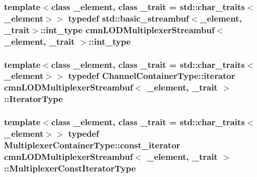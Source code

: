\subsubsection[{int\+\_\+type}]{\setlength{\rightskip}{0pt plus 5cm}template$<$class \+\_\+element, class \+\_\+trait = std\+::char\+\_\+traits$<$\+\_\+element$>$$>$ typedef std\+::basic\+\_\+streambuf$<$\+\_\+element, \+\_\+trait$>$\+::{\bf int\+\_\+type} {\bf cmn\+L\+O\+D\+Multiplexer\+Streambuf}$<$ \+\_\+element, \+\_\+trait $>$\+::{\bf int\+\_\+type}\hspace{0.3cm}{\ttfamily [protected]}}\label{classcmn_l_o_d_multiplexer_streambuf_a8d1eadc5cf72b594aa2c2fef6401fe47}
\hypertarget{classcmn_l_o_d_multiplexer_streambuf_a32236d21fe0e9a13f4bea6ed743b0613}{}
\subsubsection[{Iterator\+Type}]{\setlength{\rightskip}{0pt plus 5cm}template$<$class \+\_\+element, class \+\_\+trait = std\+::char\+\_\+traits$<$\+\_\+element$>$$>$ typedef Channel\+Container\+Type\+::iterator {\bf cmn\+L\+O\+D\+Multiplexer\+Streambuf}$<$ \+\_\+element, \+\_\+trait $>$\+::{\bf Iterator\+Type}}\label{classcmn_l_o_d_multiplexer_streambuf_a32236d21fe0e9a13f4bea6ed743b0613}
\hypertarget{classcmn_l_o_d_multiplexer_streambuf_a8c5b7460b364a24c760c4acaa6d6f042}{}
\subsubsection[{Multiplexer\+Const\+Iterator\+Type}]{\setlength{\rightskip}{0pt plus 5cm}template$<$class \+\_\+element, class \+\_\+trait = std\+::char\+\_\+traits$<$\+\_\+element$>$$>$ typedef Multiplexer\+Container\+Type\+::const\+\_\+iterator {\bf cmn\+L\+O\+D\+Multiplexer\+Streambuf}$<$ \+\_\+element, \+\_\+trait $>$\+::{\bf Multiplexer\+Const\+Iterator\+Type}}\label{classcmn_l_o_d_multiplexer_streambuf_a8c5b7460b364a24c760c4acaa6d6f042}
\hypertarget{classcmn_l_o_d_multiplexer_streambuf_abddd0ebc7e720ea977f857c6350dd5a0}{}
